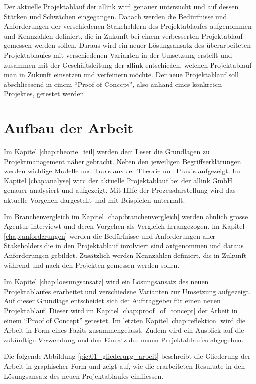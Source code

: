 Der aktuelle Projektablauf der allink wird genauer untersucht und auf 
dessen Stärken und Schwächen eingegangen. Danach werden die Bedürfnisse und 
Anforderungen der verschiedenen Stakeholdern des Projektablaufes aufgenommen und
Kennzahlen definiert, die in Zukunft bei einem verbesserten Projektablauf gemessen 
werden sollen. Daraus wird ein neuer Lösungsansatz des überarbeiteten Projektablaufes 
mit verschiedenen Varianten in der Umsetzung erstellt und zusammen mit der 
Geschäftsleitung der allink entschieden, welchen Projektablauf 
man in Zukunft einsetzen und verfeinern möchte. Der neue Projektablauf soll 
abschliessend in einem ``Proof of Concept'', also anhand eines konkreten Projektes, 
getestet werden.

\section{Aufbau der Arbeit}
Im Kapitel \ref{chap:theorie_teil} werden dem Leser die Grundlagen zu Projektmanagement 
näher gebracht. Neben den jeweiligen Begriffserklärungen werden wichtige Modelle 
und Tools aus der Theorie und Praxis aufgezeigt.
Im Kapitel \ref{chap:analyse} wird der aktuelle Projektablauf bei der allink
GmbH genauer analysiert und aufgezeigt. Mit Hilfe der Prozessdarstellung wird
das aktuelle Vorgehen dargestellt und mit Beispielen untermalt.

Im Branchenvergleich im Kapitel \ref{chap:branchenvergleich} werden ähnlich 
grosse Agentur interviewt und deren Vorgehen als Vergleich herangezogen.
Im Kapitel \ref{chap:anforderungen} werden die Bedürfnisse und Anforderungen 
aller Stakeholders die in den Projektablauf involviert sind aufgenommen und daraus
Anforderungen gebildet. Zusätzlich werden Kennzahlen definiert, die in Zukunft
während und nach den Projekten gemessen werden sollen.

Im Kapitel \ref{chap:loesungsansatz} wird ein Lösungsansatz des neuen Projektablaufes
erarbeitet und verschiedene Varianten zur Umsetzung aufgezeigt. Auf dieser Grundlage
entscheidet sich der Auftraggeber für einen neuen Projektablauf. Dieser wird
im Kapitel \ref{chap:proof_of_concept} der Arbeit in einem ``Proof of Concept'' 
getestet. Im letzten Kapitel \ref{chap:reflektion} wird die Arbeit in Form eines Fazits 
zusammengefasst. Zudem wird ein Ausblick auf die zukünftige Verwendung und den 
Einsatz des neuen Projektablaufes abgegeben.

Die folgende Abbildung \ref{pic:01_gliederung_arbeit} beschreibt die Gliederung der 
Arbeit in graphischer Form und zeigt auf, wie die erarbeiteten Resultate in
den Lösungsansatz des neuen Projektablaufes einfliessen.

